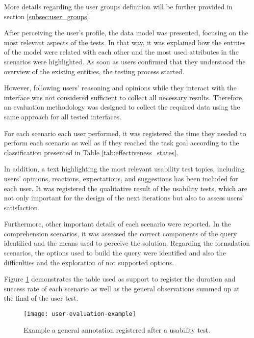 More details regarding the user groups definition will be further provided in section \ref{subsec:user_groups}.

After perceiving the user's profile, the data model was presented, focusing on the most relevant aspects of the tests. In that way, it was explained how the entities of the model were related with each other and the most used attributes in the scenarios were highlighted. As soon as users confirmed that they understood the overview of the existing entities, the testing process started. 

However, following users' reasoning and opinions while they interact with the interface was not considered sufficient to collect all necessary results. Therefore, an evaluation methodology was designed to collect the required data using the same approach for all tested interfaces.

For each scenario each user performed, it was registered the time they needed to perform each scenario as well as if they reached the task goal according to the classification presented in Table \ref{tab:effectiveness_states}. 

In addition, a text highlighting the most relevant usability test topics, including users' opinions, reactions, expectations, and suggestions has been included for each user. It was registered the qualitative result of the usability tests, which are not only important for the design of the next iterations but also to assess users' satisfaction.


Furthermore, other important details of each scenario were reported. In the comprehension scenarios, it was assessed the correct components of the query identified and the means used to perceive the solution. Regarding the formulation scenarios, the options used to build the query were identified and also the difficulties and the exploration of not supported options.


Figure \ref{fig:userEvaluationExample} demonstrates the table used as support to register the duration and success rate of each scenario as well as the general observations summed up at the final of the user test.

\begin{figure}[htbp]
	\centering
	\texttt{[image: user-evaluation-example]}
	\caption{Example a general annotation registered after a usability test.}
	\label{fig:userEvaluationExample}
\end{figure}

